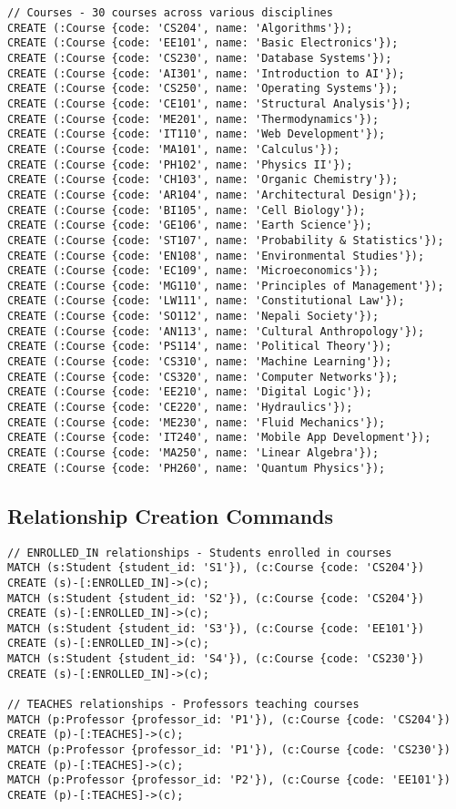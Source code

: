 \begin{verbatim}
// Courses - 30 courses across various disciplines
CREATE (:Course {code: 'CS204', name: 'Algorithms'});
CREATE (:Course {code: 'EE101', name: 'Basic Electronics'});
CREATE (:Course {code: 'CS230', name: 'Database Systems'});
CREATE (:Course {code: 'AI301', name: 'Introduction to AI'});
CREATE (:Course {code: 'CS250', name: 'Operating Systems'});
CREATE (:Course {code: 'CE101', name: 'Structural Analysis'});
CREATE (:Course {code: 'ME201', name: 'Thermodynamics'});
CREATE (:Course {code: 'IT110', name: 'Web Development'});
CREATE (:Course {code: 'MA101', name: 'Calculus'});
CREATE (:Course {code: 'PH102', name: 'Physics II'});
CREATE (:Course {code: 'CH103', name: 'Organic Chemistry'});
CREATE (:Course {code: 'AR104', name: 'Architectural Design'});
CREATE (:Course {code: 'BI105', name: 'Cell Biology'});
CREATE (:Course {code: 'GE106', name: 'Earth Science'});
CREATE (:Course {code: 'ST107', name: 'Probability & Statistics'});
CREATE (:Course {code: 'EN108', name: 'Environmental Studies'});
CREATE (:Course {code: 'EC109', name: 'Microeconomics'});
CREATE (:Course {code: 'MG110', name: 'Principles of Management'});
CREATE (:Course {code: 'LW111', name: 'Constitutional Law'});
CREATE (:Course {code: 'SO112', name: 'Nepali Society'});
CREATE (:Course {code: 'AN113', name: 'Cultural Anthropology'});
CREATE (:Course {code: 'PS114', name: 'Political Theory'});
CREATE (:Course {code: 'CS310', name: 'Machine Learning'});
CREATE (:Course {code: 'CS320', name: 'Computer Networks'});
CREATE (:Course {code: 'EE210', name: 'Digital Logic'});
CREATE (:Course {code: 'CE220', name: 'Hydraulics'});
CREATE (:Course {code: 'ME230', name: 'Fluid Mechanics'});
CREATE (:Course {code: 'IT240', name: 'Mobile App Development'});
CREATE (:Course {code: 'MA250', name: 'Linear Algebra'});
CREATE (:Course {code: 'PH260', name: 'Quantum Physics'});
\end{verbatim}

\subsection{Relationship Creation Commands}

\begin{verbatim}
// ENROLLED_IN relationships - Students enrolled in courses
MATCH (s:Student {student_id: 'S1'}), (c:Course {code: 'CS204'})
CREATE (s)-[:ENROLLED_IN]->(c);
MATCH (s:Student {student_id: 'S2'}), (c:Course {code: 'CS204'})
CREATE (s)-[:ENROLLED_IN]->(c);
MATCH (s:Student {student_id: 'S3'}), (c:Course {code: 'EE101'})
CREATE (s)-[:ENROLLED_IN]->(c);
MATCH (s:Student {student_id: 'S4'}), (c:Course {code: 'CS230'})
CREATE (s)-[:ENROLLED_IN]->(c);

// TEACHES relationships - Professors teaching courses
MATCH (p:Professor {professor_id: 'P1'}), (c:Course {code: 'CS204'})
CREATE (p)-[:TEACHES]->(c);
MATCH (p:Professor {professor_id: 'P1'}), (c:Course {code: 'CS230'})
CREATE (p)-[:TEACHES]->(c);
MATCH (p:Professor {professor_id: 'P2'}), (c:Course {code: 'EE101'})
CREATE (p)-[:TEACHES]->(c);
\end{verbatim}

